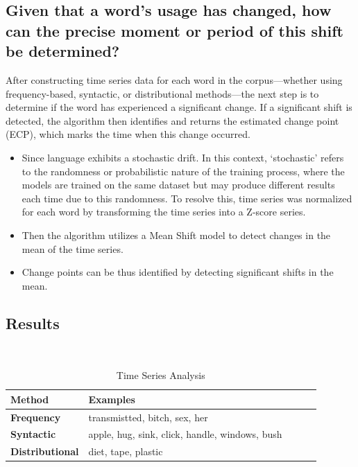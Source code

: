 \subsection{Given that a word's usage has changed, how can the precise moment or period of this shift be determined?} \label{subsec:kulkarni-rq2}
After constructing time series data for each word in the corpus—whether using frequency-based, syntactic, or distributional methods—the next step is to determine if the word has experienced a significant change.
If a significant shift is detected, the algorithm then identifies and returns the estimated change point (ECP), which marks the time when this change occurred.
\begin{itemize}
    \item Since language exhibits a stochastic drift.
        In this context, `stochastic' refers to the randomness or probabilistic nature of the training process,
        where the models are trained on the same dataset but may produce different results each time due to this randomness.
        To resolve this, time series was normalized for each word by transforming the time series into a Z-score series.
    \item Then the algorithm utilizes a Mean Shift model to detect changes in the mean of the time series.
    \item Change points can be thus identified by detecting significant shifts in the mean.
\end{itemize}

\subsection{Results} \label{subsec:kulkarni-results}

 \\

\begin{table}[]
\begin{tabular}{@{}lllll@{}}
\toprule
\textbf{Method}         & \textbf{Examples}                              &  &  &  \\ \midrule
\textbf{Frequency}      & transmistted, bitch, sex, her                  &  &  &  \\
\textbf{Syntactic}      & apple, hug, sink, click, handle, windows, bush &  &  &  \\
\textbf{Distributional} & diet, tape, plastic                            &  &  &  \\ \bottomrule
\end{tabular}
\caption{Time Series Analysis}
\label{tab:time-series-examples}
\end{table}

